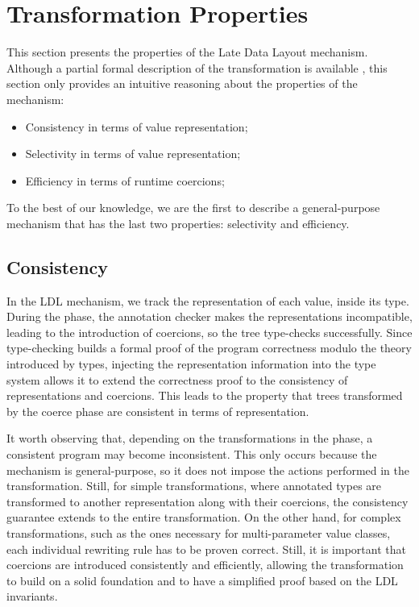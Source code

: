 \section{Transformation Properties}
\label{ldl:sec:transform-props}

This section presents the properties of the Late Data Layout mechanism. Although a partial formal description of the transformation is available \cite{ldl-form}, this section only provides an intuitive reasoning about the properties of the mechanism:

\begin{itemize}
\item Consistency in terms of value representation;
\item Selectivity in terms of value representation;
\item Efficiency in terms of runtime coercions;
\end{itemize}

To the best of our knowledge, we are the first to describe a general-purpose mechanism that has the last two properties: selectivity and efficiency.

\subsection{Consistency}

In the LDL mechanism, we track the representation of each value, inside its type. During the \coerce{} phase, the annotation checker makes the representations incompatible, leading to the introduction of coercions, so the tree type-checks successfully. Since type-checking builds a formal proof of the program correctness modulo the theory introduced by types, injecting the representation information into the type system allows it to extend the correctness proof to the consistency of representations and coercions. This leads to the property that trees transformed by the coerce phase are consistent in terms of representation.

It worth observing that, depending on the transformations in the \commit{} phase, a consistent program may become inconsistent. This only occurs because the mechanism is general-purpose, so it does not impose the actions performed in the \commit{} transformation. Still, for simple transformations, where annotated types are transformed to another representation along with their coercions, the consistency guarantee extends to the entire transformation. On the other hand, for complex transformations, such as the ones necessary for multi-parameter value classes, each individual rewriting rule has to be proven correct. Still, it is important that coercions are introduced consistently and efficiently, allowing the \commit{} transformation to build on a solid foundation and to have a simplified proof based on the LDL invariants.

